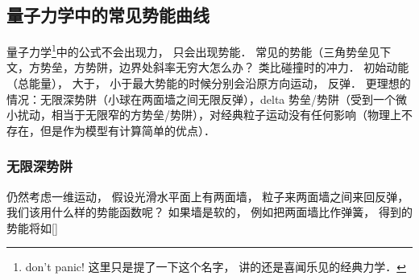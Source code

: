 \subsection{量子力学中的常见势能曲线}

量子力学\footnote{don't panic! 这里只是提了一下这个名字， 讲的还是喜闻乐见的经典力学．}中的公式不会出现力， 只会出现势能． 常见的势能（三角势垒见下文，方势垒，方势阱，边界处斜率无穷大怎么办？ 类比碰撞时的冲力． 初始动能（总能量）， 大于， 小于最大势能的时候分别会沿原方向运动， 反弹． 更理想的情况：无限深势阱（小球在两面墙之间无限反弹），delta 势垒/势阱（受到一个微小扰动，相当于无限窄的方势垒/势阱），对经典粒子运动没有任何影响（物理上不存在，但是作为模型有计算简单的优点）．

\subsubsection{无限深势阱}
仍然考虑一维运动， 假设光滑水平面上有两面墙， 粒子来两面墙之间来回反弹， 我们该用什么样的势能函数呢？ 如果墙是软的， 例如把两面墙比作弹簧， 得到的势能将如\autoref{}